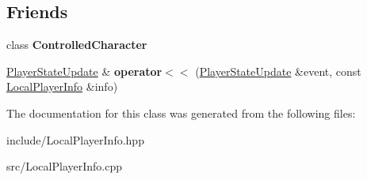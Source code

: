 \subsection*{Friends}
\begin{DoxyCompactItemize}
\item 
\hypertarget{class_local_player_info_a4d39b0761de81683fe230da3eb1dc5a7}{class {\bfseries Controlled\-Character}}\label{class_local_player_info_a4d39b0761de81683fe230da3eb1dc5a7}

\item 
\hypertarget{class_local_player_info_a1bfbdca880130264af111277acd7b93d}{\hyperlink{class_player_state_update}{Player\-State\-Update} \& {\bfseries operator$<$$<$} (\hyperlink{class_player_state_update}{Player\-State\-Update} \&event, const \hyperlink{class_local_player_info}{Local\-Player\-Info} \&info)}\label{class_local_player_info_a1bfbdca880130264af111277acd7b93d}

\end{DoxyCompactItemize}


The documentation for this class was generated from the following files\-:\begin{DoxyCompactItemize}
\item 
include/Local\-Player\-Info.\-hpp\item 
src/Local\-Player\-Info.\-cpp\end{DoxyCompactItemize}
